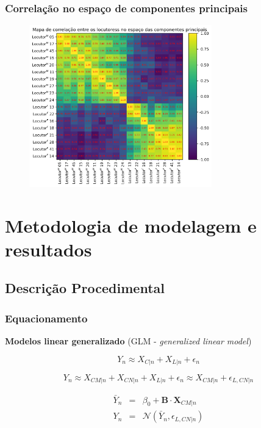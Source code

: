 \documentclass[121pt, aspectratio=169, t]{beamer}
\begin{document}
\begin{frame}[fragile=singleslide]
	\frametitle{Correlação no espaço de componentes principais}
	\vspace{-0.5cm}
	\begin{figure}
		\centering
		\includegraphics[height=7cm]{Correelacao_pca_loc.png}
	\end{figure}
\end{frame}
\section{Metodologia de modelagem e resultados}
\subsection{Descrição Procedimental}
\begin{frame}[fragile=singleslide]
	\frametitle{Equacionamento}
	\textbf{Modelos linear generalizado} (GLM - \textit{generalized linear model})
	
	\begin{equation}
		 Y_{n} \approx X_{C|n} + X_{L|n} + \epsilon_{n}
	\end{equation}

	\begin{equation}
		Y_{n} \approx X_{CM|n} + X_{CN|n} + X_{L|n} + \epsilon_{n} \approx X_{CM|n} + \epsilon_{L,CN|n}
	\end{equation}

	\begin{eqnarray}
		\bar{Y}_{n} &=& \beta_{0} +  \mathbf{B} \cdot \mathbf{X}_{CM|n} \nonumber \\
		Y_{n} &=& \mathcal{N} \left( \bar{Y}_{n} ,\epsilon_{L,CN|n} \right) 
	\end{eqnarray}

\end{frame}
\end{document}
